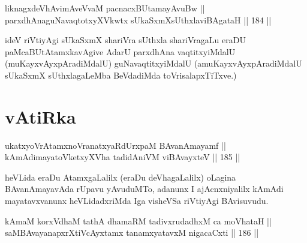 \begin{shl}
\footnotemark[3]liknagxdeVhAvimAveVvaM pacnacxBUtamayAvuBw || \\
parxdhAnaguNavaqtotxyXVkwtx sUkaSxmXsUthxlaviBAgataH \hfill || 184 ||  
\end{shl}

\begin{artha}
ideV riVtiyAgi sUkaSxmX shariVra sUthxla shariVragaLu eraDU
paMcaBUtAtamxkavAgive AdarU parxdhAna vaqtitxyiMdalU
(muKayxvAyxpAradiMdalU) guNavaqtitxyiMdalU (amuKayxvAyxpAradiMdalU
sUkaSxmX sUthxlagaLeMba BeVdadiMda toVrisalapxTiTxve.)
\end{artha}

\section*{vAtiRka}


\begin{shl}
ukatxyoVrAtamxnoVranatxyaRdUrxpaM BAvanAmayamf || \\
kAmAdimayatoVketxyXVha tadidAniVM viBAvayxteV \hfill || 185 ||  
\end{shl}

\begin{artha}
heVLida eraDu AtamxgaLalilx (eraDu deVhagaLalilx) oLagina
BAvanAmayavAda rUpavu yAvuduMTo, adanunx I ajAcnxniyalilx kAmAdi
mayatavxvanunx heVLidadxriMda Iga visheVSa riVtiyAgi BAvisuvudu.
\end{artha}


\begin{shl}
kAmaM korxVdhaM tathA dhamaRM tadivxrudadhxM ca moVhataH ||  \\
saMBAvayanapxrXtiVcAyxtamx tanamxyatavxM nigacaCxti \hfill || 186 || 
\end{shl}

